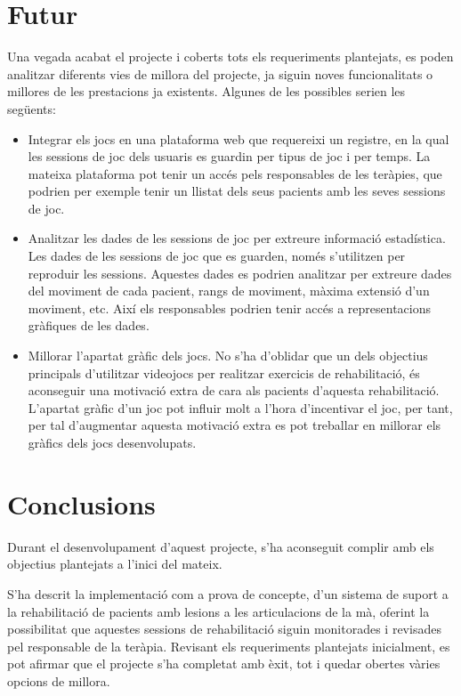 \documentclass[12pt,a4paper,catalan]{article}
\begin{document}
	\section{Futur}
	Una vegada acabat el projecte i coberts tots els requeriments plantejats, es poden analitzar diferents vies de millora del projecte, ja siguin noves funcionalitats o millores de les prestacions ja existents. Algunes de les possibles serien les següents:
	\begin{itemize}
		\item Integrar els jocs en una plataforma web que requereixi un registre, en la qual les sessions de joc dels usuaris es guardin per tipus de joc i per temps. La mateixa plataforma pot tenir un accés pels responsables de les teràpies, que podrien per exemple tenir un llistat dels seus pacients amb les seves sessions de joc.
		\item Analitzar les dades de les sessions de joc per extreure informació estadística. Les dades de les sessions de joc que es guarden, només s'utilitzen per reproduir les sessions. Aquestes dades es podrien analitzar per extreure dades del moviment de cada pacient, rangs de moviment, màxima extensió d'un moviment, etc. Així els responsables podrien tenir accés a representacions gràfiques de les dades.
		\item Millorar l'apartat gràfic dels jocs. No s'ha d'oblidar que un dels objectius principals d'utilitzar videojocs per realitzar exercicis de rehabilitació, és aconseguir una motivació extra de cara als pacients d'aquesta rehabilitació. L'apartat gràfic d'un joc pot influir molt a l'hora d'incentivar el joc, per tant, per tal d'augmentar aquesta motivació extra es pot treballar en millorar els gràfics dels jocs desenvolupats.
	\end{itemize}
	\section{Conclusions}
	Durant el desenvolupament d'aquest projecte, s'ha aconseguit complir amb els objectius plantejats a l'inici del mateix.
	
	S'ha descrit la implementació com a prova de concepte, d'un sistema de suport a la rehabilitació de pacients amb lesions a les articulacions de la mà, oferint la possibilitat que aquestes sessions de rehabilitació siguin monitorades i revisades pel responsable de la teràpia.
	Revisant els requeriments plantejats inicialment, es pot afirmar que el projecte s'ha completat amb èxit, tot i quedar obertes vàries opcions de millora.
	
\end{document}
